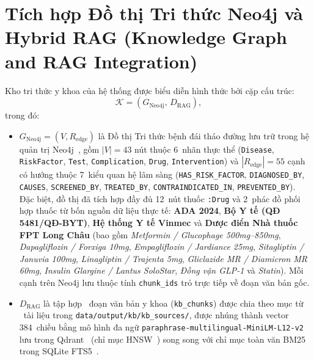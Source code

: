 
\section{Tích hợp Đồ thị Tri thức Neo4j và Hybrid RAG (Knowledge Graph and RAG Integration)}
\label{sec:kg-rag-integration}

Kho tri thức y khoa của hệ thống được biểu diễn hình thức bởi cặp cấu trúc:
\begin{equation}
  \mathcal{K} = (G_{\text{Neo4j}},\, D_{\text{RAG}}),
  \label{eq:knowledge-repo}
\end{equation}
trong đó:
\begin{itemize}
  \item $G_{\text{Neo4j}} = (V, R_{\text{edge}})$ là Đồ thị Tri thức bệnh đái tháo đường lưu trữ trong hệ quản trị Neo4j~\cite{neo4j}, gồm $|V| = 43$ nút thuộc 6~nhãn thực thể (\texttt{Disease}, \texttt{RiskFactor}, \texttt{Test}, \texttt{Complication}, \texttt{Drug}, \texttt{Intervention}) và $|R_{\text{edge}}| = 55$ cạnh có hướng thuộc 7~kiểu quan hệ lâm sàng (\texttt{HAS\_RISK\_FACTOR}, \texttt{DIAGNOSED\_BY}, \texttt{CAUSES}, \texttt{SCREENED\_BY}, \texttt{TREATED\_BY}, \texttt{CONTRAINDICATED\_IN}, \texttt{PREVENTED\_BY}). Đặc biệt, đồ thị đã tích hợp đầy đủ 12~nút thuốc \texttt{:Drug} và 2~phác đồ phối hợp thuốc từ bốn nguồn dữ liệu thực tế: \textbf{ADA 2024}, \textbf{Bộ Y tế (QĐ 5481/QĐ-BYT)}, \textbf{Hệ thống Y tế Vinmec} và \textbf{Dược điển Nhà thuốc FPT Long Châu} (bao gồm \emph{Metformin / Glucophage 500mg--850mg}, \emph{Dapagliflozin / Forxiga 10mg}, \emph{Empagliflozin / Jardiance 25mg}, \emph{Sitagliptin / Januvia 100mg}, \emph{Linagliptin / Trajenta 5mg}, \emph{Gliclazide MR / Diamicron MR 60mg}, \emph{Insulin Glargine / Lantus SoloStar}, \emph{Đồng vận GLP-1} và \emph{Statin}). Mỗi cạnh trên Neo4j lưu thuộc tính \texttt{chunk\_ids} trỏ trực tiếp về đoạn văn bản gốc.
  \item $D_{\text{RAG}}$ là tập hợp ~đoạn văn bản y khoa (\texttt{kb\_chunks}) được chia theo mục từ ~tài liệu  trong \texttt{data/output/kb/kb\_sources/}, được nhúng thành vector 384~chiều bằng mô hình đa ngữ \texttt{paraphrase-multilingual-MiniLM-L12-v2}~\cite{reimers2020} lưu trong Qdrant~\cite{qdrant} (chỉ mục HNSW~\cite{malkov2018}) song song với chỉ mục toàn văn BM25 trong SQLite FTS5~\cite{sqlitefts5}.
\end{itemize}

